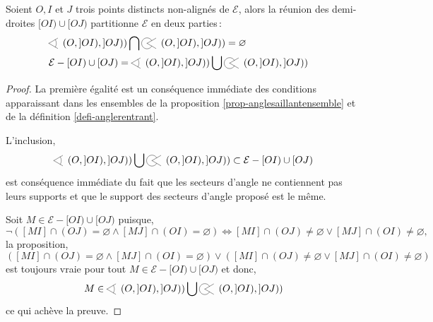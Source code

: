 \begin{thm}
    Soient $O,I$ et $J$ trois points distincts non-alignés de $\mathcal{E}$, alors la réunion des demi-droites $[OI)\cup [OJ)$ partitionne $\mathcal{E}$ en deux parties\,:   
    \begin{align*}
        &\anglesaillant\left({O},{]OI)},{]OJ)}\right) \bigcap \anglerentrant\left({O},{]OI)},{]OJ)}\right) = \varnothing &\\
        &\mathcal{E} - [OI)\cup[OJ) = \anglesaillant\left({O},{]OI)},{]OJ)}\right) \bigcup \anglerentrant\left({O},{]OI)},{]OJ)}\right)&
    \end{align*}
    \begin{proof}
        La première égalité est un conséquence immédiate des conditions apparaissant dans les ensembles de la proposition \ref{prop-anglesaillantensemble} et de la définition \ref{defi-anglerentrant}.

        L'inclusion,
        \begin{equation*}
            \anglesaillant\left({O},{]OI)},{]OJ)}\right) \bigcup \anglerentrant\left({O},{]OI)},{]OJ)}\right) \subset \mathcal{E} - [OI)\cup[OJ)
        \end{equation*}
        est conséquence immédiate du fait que les secteurs d'angle ne contiennent pas leurs supports et que le support des secteurs d'angle proposé est le même. 

        Soit $M\in \mathcal{E} - [OI)\cup[OJ)$ puisque,
        \begin{equation*}
            \neg\left( [MI]\cap(OJ) = \varnothing \wedge [MJ]\cap(OI) = \varnothing \right) \Longleftrightarrow [MI]\cap(OJ) \neq \varnothing \lor [MJ]\cap(OI) \neq \varnothing,
        \end{equation*}
        la proposition,
        \begin{equation*}
            \left( [MI]\cap(OJ) = \varnothing \wedge [MJ]\cap(OI) = \varnothing \right) \lor \left([MI]\cap(OJ) \neq \varnothing \lor [MJ]\cap(OI) \neq \varnothing\right)
        \end{equation*}
        est toujours vraie pour tout $M\in \mathcal{E} - [OI)\cup[OJ)$ et donc,
        \begin{equation*}
            M\in \anglesaillant\left({O},{]OI)},{]OJ)}\right) \bigcup \anglerentrant\left({O},{]OI)},{]OJ)}\right)
        \end{equation*}
        ce qui achève la preuve.
    \end{proof}
\end{thm}


